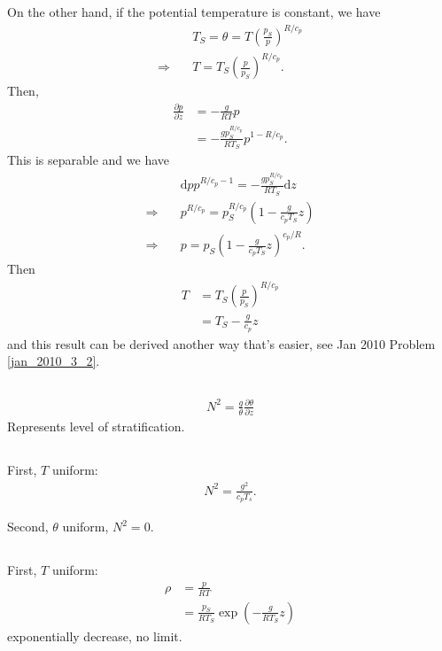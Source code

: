 \documentclass[11pt,letterpaper]{book}
\theoremstyle{definition}
\newcommand{\de}{\mathrm{d}}
\newcommand{\pe}{\partial}
\newcommand{\thus}{\Rightarrow \quad }
\begin{document}
\subsection{}
On the other hand, if the potential temperature is constant, we have
\begin{align*}
    &T_S = \theta = T\left(\frac{p_S}{p}\right)^{R/c_p}\\
    \thus &T = T_S\left(\frac{p}{p_S}\right)^{R/c_p}.
\end{align*}
Then,
\begin{align*}
    \frac{\pe p}{\pe z} &= -\frac{g}{RT} p\\
    &= -\frac{g p_S^{R/c_p}}{R T_S} p^{1-R/c_p}.
\end{align*}
This is separable and we have
\begin{align*}
    &\de p p^{R/c_p-1} = -\frac{g p_S^{R/c_p}}{R T_S}\de z\\
    \thus &p^{R/c_p} = p_S^{R/c_p}\left(1-\frac{g }{c_p T_S}z\right)\\
    \thus &p = p_S \left(1-\frac{g }{c_p T_S}z\right)^{c_p/R}.
\end{align*}
Then
\begin{align*}
    T &= T_S\left(\frac{p}{p_S}\right)^{R/c_p}\\
    &= T_S-\frac{g}{c_p}z
\end{align*}
and this result can be derived another way that's easier, see Jan 2010 Problem \ref{jan_2010_3_2}. 

\subsection{}
\begin{align*}
    N^2 = \frac{g}{\theta}\frac{\pe\theta}{\pe z}
\end{align*}
Represents level of stratification.

\subsection{}
First, $T$ uniform: 
\begin{align*}
    N^2 = \frac{g^2}{c_p T_s}.
\end{align*}

Second, $\theta$ uniform, $N^2 = 0$.

\subsection{}
First, $T$ uniform: 
\begin{align*}
    \rho &= \frac{p}{RT}\\
    &= \frac{p_S}{RT_S}\exp\left( -\frac{g}{RT_S}z \right)
\end{align*}
exponentially decrease, no limit.
\end{document}
